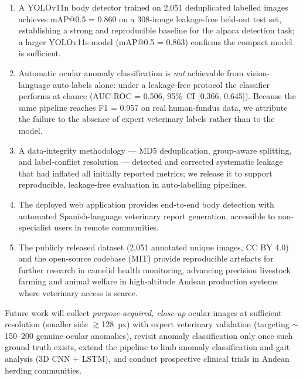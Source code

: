 \documentclass[journal=animals,article=article,submit=mdpi,moreauthors=true,pdftex]{mdpi}
\begin{document}
\begin{enumerate}
  \item A YOLOv11n body detector trained on 2,051 deduplicated labelled images achieves
        mAP@0.5 = 0.860 on a 308-image leakage-free held-out test set, establishing a
        strong and reproducible baseline for the alpaca detection task; a larger
        YOLOv11s model (mAP@0.5 = 0.863) confirms the compact model is sufficient.
  \item Automatic ocular anomaly classification is \emph{not} achievable from
        vision-language auto-labels alone: under a leakage-free protocol the classifier
        performs at chance (AUC-ROC = 0.506, 95\%~CI [0.366, 0.645]). Because the same
        pipeline reaches F1 = 0.957 on real human-fundus data, we attribute the failure
        to the absence of expert veterinary labels rather than to the model.
  \item A data-integrity methodology --- MD5 deduplication, group-aware splitting, and
        label-conflict resolution --- detected and corrected systematic leakage that had
        inflated all initially reported metrics; we release it to support reproducible,
        leakage-free evaluation in auto-labelling pipelines.
  \item The deployed web application provides end-to-end body detection with
        automated Spanish-language veterinary report generation, accessible to
        non-specialist users in remote communities.
  \item The publicly released dataset (2,051 annotated unique images, CC BY 4.0) and
        the open-source codebase (MIT) provide reproducible artefacts for further research
        in camelid health monitoring, advancing precision livestock farming and animal
        welfare in high-altitude Andean production systems where veterinary access is
        scarce.
\end{enumerate}

Future work will collect \emph{purpose-acquired, close-up} ocular images at sufficient
resolution (smaller side $\gtrsim$128~px) with expert veterinary validation (targeting
$\sim$150--200 genuine ocular anomalies), revisit anomaly classification only once such
ground truth exists, extend the pipeline to limb anomaly classification and gait analysis
(3D CNN + LSTM), and conduct prospective clinical trials in Andean herding communities.

\vspace{6pt}
\end{document}
